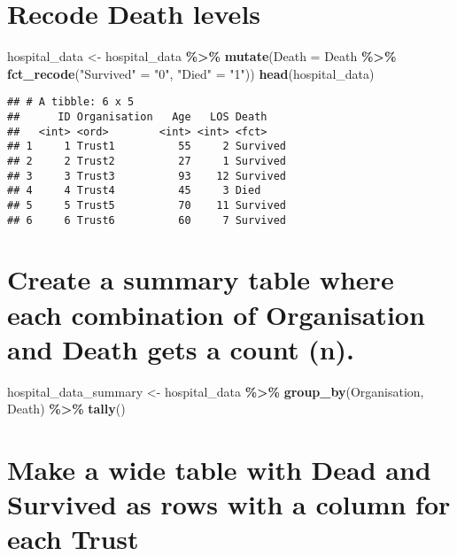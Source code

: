 \documentclass[
]{article}
\newenvironment{Shaded}{\begin{snugshade}}{\end{snugshade}}
\newcommand{\AttributeTok}[1]{\textcolor[rgb]{0.13,0.29,0.53}{#1}}
\newcommand{\FunctionTok}[1]{\textcolor[rgb]{0.13,0.29,0.53}{\textbf{#1}}}
\newcommand{\NormalTok}[1]{#1}
\newcommand{\OtherTok}[1]{\textcolor[rgb]{0.56,0.35,0.01}{#1}}
\newcommand{\SpecialCharTok}[1]{\textcolor[rgb]{0.81,0.36,0.00}{\textbf{#1}}}
\newcommand{\StringTok}[1]{\textcolor[rgb]{0.31,0.60,0.02}{#1}}
\begin{document}
\section{Recode Death levels}\label{recode-death-levels}

\begin{Shaded}
\begin{Highlighting}[]
\NormalTok{hospital\_data }\OtherTok{\textless{}{-}}\NormalTok{ hospital\_data }\SpecialCharTok{\%\textgreater{}\%} 
  \FunctionTok{mutate}\NormalTok{(}\AttributeTok{Death =}\NormalTok{ Death }\SpecialCharTok{\%\textgreater{}\%} 
           \FunctionTok{fct\_recode}\NormalTok{(}\StringTok{"Survived"} \OtherTok{=} \StringTok{"0"}\NormalTok{, }\StringTok{"Died"} \OtherTok{=} \StringTok{"1"}\NormalTok{))}
\FunctionTok{head}\NormalTok{(hospital\_data)}
\end{Highlighting}
\end{Shaded}

\begin{verbatim}
## # A tibble: 6 x 5
##      ID Organisation   Age   LOS Death   
##   <int> <ord>        <int> <int> <fct>   
## 1     1 Trust1          55     2 Survived
## 2     2 Trust2          27     1 Survived
## 3     3 Trust3          93    12 Survived
## 4     4 Trust4          45     3 Died    
## 5     5 Trust5          70    11 Survived
## 6     6 Trust6          60     7 Survived
\end{verbatim}

\section{Create a summary table where each combination of Organisation
and Death gets a count
(n).}\label{create-a-summary-table-where-each-combination-of-organisation-and-death-gets-a-count-n.}

\begin{Shaded}
\begin{Highlighting}[]
\NormalTok{hospital\_data\_summary }\OtherTok{\textless{}{-}}\NormalTok{ hospital\_data }\SpecialCharTok{\%\textgreater{}\%} 
  \FunctionTok{group\_by}\NormalTok{(Organisation, Death) }\SpecialCharTok{\%\textgreater{}\%} 
  \FunctionTok{tally}\NormalTok{()}
\end{Highlighting}
\end{Shaded}

\section{Make a wide table with Dead and Survived as rows with a column
for each
Trust}\label{make-a-wide-table-with-dead-and-survived-as-rows-with-a-column-for-each-trust}
\end{document}
